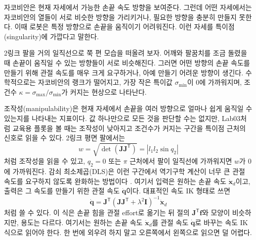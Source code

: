 자코비안은 현재 자세에서 가능한 손끝 속도 방향을 보여준다.
그런데 어떤 자세에서는 자코비안의 열들이 서로 비슷한 방향을 가리키거나, 필요한 방향을 충분히 만들지 못한다.
이때 로봇은 특정 방향으로 손끝을 움직이기 어려워진다.
이런 자세를 특이점(singularity)에 가깝다고 말한다.

2링크 팔을 거의 일직선으로 쭉 편 모습을 떠올려 보자.
어깨와 팔꿈치를 조금 돌렸을 때 손끝이 움직일 수 있는 방향들이 서로 비슷해진다.
그러면 어떤 방향의 손끝 속도를 만들기 위해 관절 속도를 매우 크게 요구하거나, 아예 만들기 어려운 방향이 생긴다.
수학적으로는 자코비안의 랭크가 떨어지고, 가장 작은 특이값 \(\sigma_{\min}\)이 0에 가까워지며, 조건수 \(\kappa=\sigma_{\max}/\sigma_{\min}\)가 커지는 현상으로 나타난다.

조작성(manipulability)은 현재 자세에서 손끝을 여러 방향으로 얼마나 쉽게 움직일 수 있는지를 나타내는 지표이다.
값 하나만으로 모든 것을 판단할 수는 없지만, Lab03처럼 교육용 플롯을 볼 때는 조작성이 낮아지고 조건수가 커지는 구간을 특이점 근처의 신호로 읽을 수 있다.
2링크 평면 팔에서는
\begin{equation}
  w
  =
  \sqrt{\det(\bm{J}\bm{J}^{\mathsf{T}})}
  =
  |l_1l_2\sin q_2|
  \label{eq:two-link-manipulability}
\end{equation}
처럼 조작성을 읽을 수 있고, \(q_2=0\) 또는 \(\pi\) 근처에서 팔이 일직선에 가까워지면 \(w\)가 0에 가까워진다.
감쇠 최소제곱(DLS)은 이런 구간에서 역기구학 계산이 너무 큰 관절 속도를 요구하지 않도록 완화하는 방법이다 \cite{buss2005sdls}.
여기서 입력은 원하는 손끝 속도 \(\dot{\bm{x}}_d\)이고, 출력은 그 속도를 만들기 위한 관절 속도 \(\dot{\bm{q}}\)이다.
대표적인 속도 IK 형태로 쓰면
\begin{equation}
  \dot{\bm{q}}
  =
  \bm{J}^{\mathsf{T}}
  \left(\bm{J}\bm{J}^{\mathsf{T}}+\lambda^2\bm{I}\right)^{-1}
  \dot{\bm{x}}_d
  \label{eq:dls-velocity-ik}
\end{equation}
처럼 쓸 수 있다.
이 식은 손끝 힘을 관절 effort로 옮기는 뒤 절의 \(\bm{J}^{\mathsf{T}}\bm{f}\)와 모양이 비슷하지만, 용도는 다르다.
%
여기서는 원하는 손끝 속도 \(\dot{\bm{x}}_d\)를 관절 속도 \(\dot{\bm{q}}\)로 바꾸는 속도 IK 식으로 읽어야 한다.
한 번에 외우려 하지 말고 오른쪽에서 왼쪽으로 읽으면 덜 어렵다.

